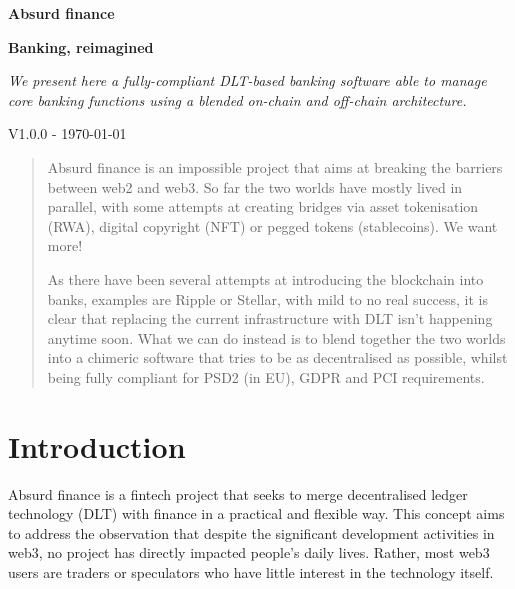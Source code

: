 \documentclass[a4paper,10 pt]{article}
\theoremstyle{definition}
\begin{document}
\begin{titlepage}
    \begin{center}
        \vspace*{1cm}
            
        \Huge
        \textbf{Absurd finance}

        \vspace{0.5cm}
        \Large
        {\bf Banking, reimagined}

        \vspace{1cm}
        \Large
        {\it We present here a fully-compliant DLT-based banking software able to manage core banking functions using a blended on-chain and off-chain architecture.}

        \vspace{1.5cm}
        {\normalsize V1.0.0 - \today}
        \vspace{1.0cm}

        \begin{abstract}        
        Absurd finance is an impossible project that aims at breaking the barriers between web2 and web3. So far the two worlds have mostly lived in parallel, with some attempts at creating bridges via asset tokenisation (RWA), digital copyright (NFT) or pegged tokens (stablecoins).
        We want more!
        
        As there have been several attempts at introducing the blockchain into banks, examples are Ripple or Stellar, with mild to no real success, it is clear that replacing the current infrastructure with DLT isn’t happening anytime soon. What we can do instead is to blend together the two worlds into a chimeric software that tries to be as decentralised as possible, whilst being fully compliant for PSD2 (in EU), GDPR and PCI requirements.        
        \end{abstract}
            
    \end{center}
\tableofcontents
\end{titlepage}

\section{Introduction}

Absurd finance is a fintech project that seeks to merge decentralised ledger technology (DLT) with finance in a practical and flexible way. This concept aims to address the observation that despite the significant development activities in web3, no project has directly impacted people's daily lives. Rather, most web3 users are traders or speculators who have little interest in the technology itself.  
\end{document}
